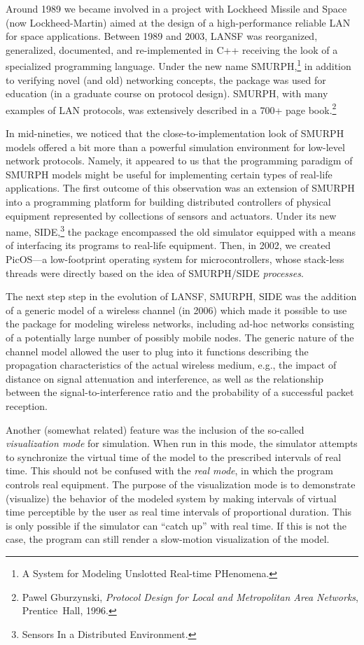 Around 1989 we became involved in a project with Lockheed Missile and Space
(now Lockheed-Martin) aimed at the design of a high-performance reliable
LAN for space applications.
Between 1989 and 2003, {\sc LANSF} was reorganized, generalized, documented, and
re-implemented in C++ receiving the look of a specialized programming
language.
Under the new name {\sc SMURPH},\footnote{A System
for Modeling Unslotted Real-time
PHenomena.}
in addition to verifying novel (and old) networking concepts,
the package was used for education (in a graduate course on
protocol design).
{\sc SMURPH}, with many examples of LAN protocols, was extensively described in
a 700+ page book.\footnote{Pawel Gburzynski,
{\em Protocol Design for Local and Metropolitan Area Networks},
Prentice~Hall, 1996.}

In mid-nineties, we noticed that the close-to-implementation look of
{\sc SMURPH}
models offered a bit more than a powerful simulation environment
for low-level network protocols.
Namely, it appeared to us that the programming paradigm of {\sc SMURPH} models 
might be useful for implementing certain types of real-life applications.
The first outcome of this observation was an extension of {\sc SMURPH} into a
programming platform for building distributed controllers of physical
equipment represented by collections of sensors and actuators.
Under its new name, {\sc SIDE},\footnote{Sensors In a Distributed Environment.}
the package encompassed the old simulator equipped with a means of interfacing
its programs to real-life equipment.
Then, in 2002, we created PicOS---a low-footprint operating system for
microcontrollers, whose stack-less threads were directly based on the idea of
{\sc SMURPH/SIDE} {\em processes}.

The next step
step in the evolution of {\sc LANSF}, {\sc SMURPH}, {\sc SIDE} was the addition
of a generic model of a wireless channel (in 2006) which made it possible to use
the package for modeling wireless networks, including ad-hoc networks
consisting of a potentially large number of possibly mobile nodes.
The generic nature of the channel model allowed the user to plug into it
functions describing the propagation characteristics of the actual wireless
medium,
e.g., the impact of distance on signal attenuation and interference,
as well as the relationship between the signal-to-interference ratio
and the probability of a successful packet reception.

Another (somewhat related) feature was the inclusion of the so-called {\em visualization
mode\/} for simulation.
When run in this mode, the simulator attempts to synchronize the virtual time
of the model to the prescribed intervals of real time.
This should not be confused with the {\em real mode}, in which the program
controls real equipment.
The purpose of the visualization mode is to demonstrate (visualize)
the behavior of the modeled system by making intervals of virtual time
perceptible by the user as real time intervals of proportional
duration.
This is only possible if the simulator can ``catch up'' with real time.
If this is not the case, the program can still render a slow-motion visualization of the
model.

